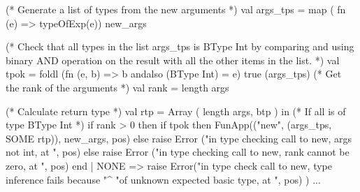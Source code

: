 \documentclass[10pt]{article}
\begin{document}
\begin{fancycode}[frame=lines,fontsize=\scriptsize,label=\textit{edited code - SRC/Type.sml}]
             (* Generate a list of types from the new arguments *)
             val args_tps = map ( fn (e) => typeOfExp(e)) new_args

             (* Check that all types in the list args_tps is BType Int by
                comparing and using binary AND operation on the result with
                all the other items in the list. *)
             val tpok = foldl
                        (fn (e, b) => b andalso (BType Int) = e) true
                        (args_tps)
             (* Get the rank of the arguments *)
             val rank = length args

             (* Calculate return type *)
             val rtp = Array ( length args, btp )
           in
             (* If all is of type BType Int *)
             if rank > 0 then
               if tpok
               then
                 FunApp(("new", (args_tps, SOME rtp)), new_args, pos)
               else raise Error ("in type checking call to new, args not int, at ", pos)
             else raise Error ("in type checking call to new, rank cannot be zero, at ", pos)
           end
       | NONE     => raise Error("in type check call to new, type inference fails because "^
                                 "of unknown expected basic type, at ", pos) )
...
\end{fancycode}
\end{document}

